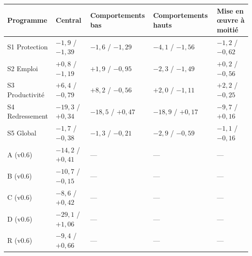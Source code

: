 \begin{tabular}{lllll}\toprule Programme & Central & Comportements bas & Comportements hauts & Mise en œuvre à moitié\\ \midrule
S1 Protection & $-1{,}9$ / $-1{,}39$ & $-1{,}6$ / $-1{,}29$ & $-4{,}1$ / $-1{,}56$ & $-1{,}2$ / $-0{,}62$\\
S2 Emploi & $+0{,}8$ / $-1{,}19$ & $+1{,}9$ / $-0{,}95$ & $-2{,}3$ / $-1{,}49$ & $+0{,}2$ / $-0{,}56$\\
S3 Productivité & $+6{,}4$ / $-0{,}79$ & $+8{,}2$ / $-0{,}56$ & $+2{,}0$ / $-1{,}11$ & $+2{,}2$ / $-0{,}25$\\
S4 Redressement & $-19{,}3$ / $+0{,}34$ & $-18{,}5$ / $+0{,}47$ & $-18{,}9$ / $+0{,}17$ & $-9{,}7$ / $+0{,}16$\\
S5 Global & $-1{,}7$ / $-0{,}38$ & $-1{,}3$ / $-0{,}21$ & $-2{,}9$ / $-0{,}59$ & $-1{,}1$ / $-0{,}16$\\
A (v0.6) & $-14{,}2$ / $+0{,}41$ & --- & --- & ---\\
B (v0.6) & $-10{,}7$ / $-0{,}15$ & --- & --- & ---\\
C (v0.6) & $-8{,}6$ / $+0{,}42$ & --- & --- & ---\\
D (v0.6) & $-29{,}1$ / $+1{,}06$ & --- & --- & ---\\
R (v0.6) & $-9{,}4$ / $+0{,}66$ & --- & --- & ---\\\bottomrule\end{tabular}